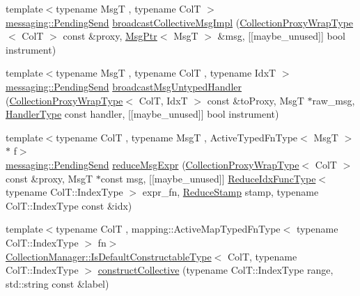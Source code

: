 \begin{DoxyCompactItemize}
\item 
{\footnotesize template$<$typename MsgT , typename ColT $>$ }\\\hyperlink{structvt_1_1messaging_1_1_pending_send}{messaging\+::\+Pending\+Send} \hyperlink{structvt_1_1vrt_1_1collection_1_1_collection_manager_a19c677319f5a271f0eb4b6f8ab3841e3}{broadcast\+Collective\+Msg\+Impl} (\hyperlink{structvt_1_1vrt_1_1collection_1_1_collection_manager_a56458ed7f9bb22b631b9b3a745f42f94}{Collection\+Proxy\+Wrap\+Type}$<$ ColT $>$ const \&proxy, \hyperlink{namespacevt_a9f5ebd62ee9d6dd8829e3e1cc4f858e9}{Msg\+Ptr}$<$ MsgT $>$ \&msg, \mbox{[}\mbox{[}maybe\+\_\+unused\mbox{]}\mbox{]} bool instrument)
\item 
{\footnotesize template$<$typename MsgT , typename ColT , typename IdxT $>$ }\\\hyperlink{structvt_1_1messaging_1_1_pending_send}{messaging\+::\+Pending\+Send} \hyperlink{structvt_1_1vrt_1_1collection_1_1_collection_manager_afff1f2d8dc1abc042e71fa4055584724}{broadcast\+Msg\+Untyped\+Handler} (\hyperlink{structvt_1_1vrt_1_1collection_1_1_collection_manager_a56458ed7f9bb22b631b9b3a745f42f94}{Collection\+Proxy\+Wrap\+Type}$<$ ColT, IdxT $>$ const \&to\+Proxy, MsgT $\ast$raw\+\_\+msg, \hyperlink{namespacevt_af64846b57dfcaf104da3ef6967917573}{Handler\+Type} const handler, \mbox{[}\mbox{[}maybe\+\_\+unused\mbox{]}\mbox{]} bool instrument)
\item 
{\footnotesize template$<$typename ColT , typename MsgT , Active\+Typed\+Fn\+Type$<$ Msg\+T $>$ $\ast$ f$>$ }\\\hyperlink{structvt_1_1messaging_1_1_pending_send}{messaging\+::\+Pending\+Send} \hyperlink{structvt_1_1vrt_1_1collection_1_1_collection_manager_a7b0a7fd93f21b50976b0d7950eba3871}{reduce\+Msg\+Expr} (\hyperlink{structvt_1_1vrt_1_1collection_1_1_collection_manager_a56458ed7f9bb22b631b9b3a745f42f94}{Collection\+Proxy\+Wrap\+Type}$<$ ColT $>$ const \&proxy, MsgT $\ast$const msg, \mbox{[}\mbox{[}maybe\+\_\+unused\mbox{]}\mbox{]} \hyperlink{structvt_1_1vrt_1_1collection_1_1_collection_manager_a47a3227ae0195c15187e8dc8762f66c4}{Reduce\+Idx\+Func\+Type}$<$ typename Col\+T\+::\+Index\+Type $>$ expr\+\_\+fn, \hyperlink{structvt_1_1vrt_1_1collection_1_1_collection_manager_ae8aac19e0ae07e9225142e5880eac830}{Reduce\+Stamp} stamp, typename Col\+T\+::\+Index\+Type const \&idx)
\item 
{\footnotesize template$<$typename ColT , mapping\+::\+Active\+Map\+Typed\+Fn\+Type$<$ typename Col\+T\+::\+Index\+Type $>$ fn$>$ }\\\hyperlink{structvt_1_1vrt_1_1collection_1_1_collection_manager_af8091fcb8218dad155ea028c9b5d283f}{Collection\+Manager\+::\+Is\+Default\+Constructable\+Type}$<$ ColT, typename Col\+T\+::\+Index\+Type $>$ \hyperlink{structvt_1_1vrt_1_1collection_1_1_collection_manager_acc57a9d8e4c2354a50075e1a68ffc796}{construct\+Collective} (typename Col\+T\+::\+Index\+Type range, std\+::string const \&label)

\end{DoxyCompactItemize}
